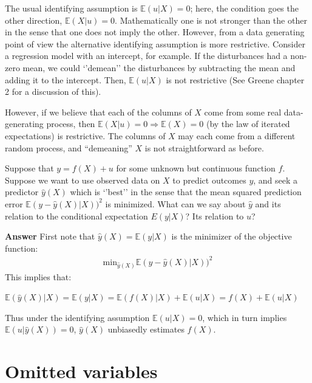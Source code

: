 \documentclass[11pt]{exam}
\begin{document}
\begin{questions}
The usual identifying assumption is \(\mathbb{E}(u|X) = 0\); here, the
condition goes the other direction, \(\mathbb{E}(X|u) = 0\). Mathematically one is not stronger than the other in the sense that one
does not imply the other. However, from a data generating point of view the
alternative identifying assumption is more restrictive. Consider a
regression model with an intercept, for example. If the disturbances had
a non-zero mean, we could `'demean'' the disturbances by subtracting the
mean and adding it to the intercept. Then, \(\mathbb{E}(u|X)\) is not
restrictive (See Greene chapter 2 for a discussion of this).

However, if we believe that each of the columns of \(X\) come from some real data-generating process, then \(\mathbb{E}(X|u) = 0 \Rightarrow \mathbb{E}(X) = 0\) (by the law of iterated expectations) is restrictive. The columns of \(X\) may each come from a different random process, and ``demeaning'' \(X\) is not straightforward as before.

\question Suppose that \(y = f(X) + u\) for some unknown but
continuous function \(f\). Suppose we want to use observed data on \(X\)
to predict outcomes \(y\), and seek a predictor \(\hat{y}(X)\) which is
`'best'' in the sense that the mean squared prediction error
\(\mathbb{E}(y-\hat{y}(X)|X))^2\) is minimized. What can we say about
\(\hat{y}\) and its relation to the conditional expectation \(E(y|X)\)?
Its relation to \(u\)?

\textbf{Answer} First note that \(\hat{y}(X) = \mathbb{E}(y|X)\) is the
minimizer of the objective function:
\begin{align*}
\text{min}_{\hat{y}(X)} \mathbb{E}(y-\hat{y}(X)|X))^2 
\end{align*}
This implies that:

\(\mathbb{E}(\hat{y}(X)|X) = \mathbb{E}(y|X) = \mathbb{E}(f(X)|X) + \mathbb{E}(u|X) = f(X) + \mathbb{E}(u|X)\)

Thus under the identifying assumption \(\mathbb{E}(u|X) = 0\), which in turn implies $\mathbb{E}(u|\hat{y}(X)) = 0$, \(\hat{y}(X)\) unbiasedly estimates \(f(X)\). 

\end{questions}

\hypertarget{omitted-variables}{%
\section{Omitted variables}\label{omitted-variables}}
\end{document}
